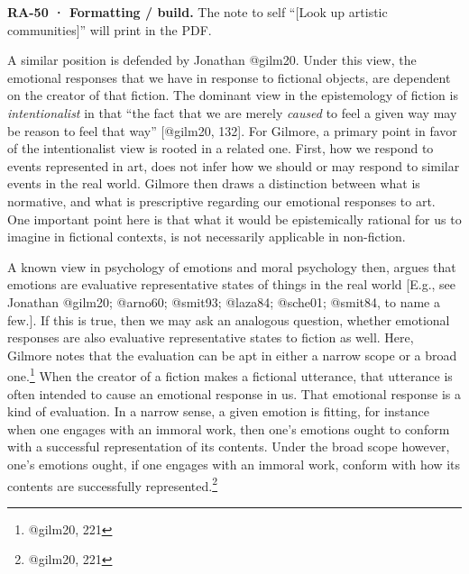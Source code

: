 \documentclass[
  letterpaper,
  DIV=11,
  numbers=noendperiod]{scrartcl}
\theoremstyle{remark}
\begin{document}
\begin{tcolorbox}[enhanced jigsaw, arc=.35mm, bottomrule=.15mm, bottomtitle=1mm, breakable, colback=white, colbacktitle=quarto-callout-note-color!10!white, colframe=quarto-callout-note-color-frame, coltitle=black, left=2mm, leftrule=.75mm, opacityback=0, opacitybacktitle=0.6, rightrule=.15mm, title=\textcolor{quarto-callout-note-color}{\faInfo}\hspace{0.5em}{Note}, titlerule=0mm, toprule=.15mm, toptitle=1mm]

\textbf{RA-50 · Formatting / build.} The note to self ``{[}Look up
artistic communities{]}'' will print in the PDF.

\end{tcolorbox}

A similar position is defended by Jonathan @gilm20. Under this view, the
emotional responses that we have in response to fictional objects, are
dependent on the creator of that fiction. The dominant view in the
epistemology of fiction is \emph{intentionalist} in that ``the fact that
we are merely \emph{caused} to feel a given way may be reason to feel
that way'' {[}@gilm20, 132{]}. For Gilmore, a primary point in favor of
the intentionalist view is rooted in a related one. First, how we
respond to events represented in art, does not infer how we should or
may respond to similar events in the real world. Gilmore then draws a
distinction between what is normative, and what is prescriptive
regarding our emotional responses to art. One important point here is
that what it would be epistemically rational for us to imagine in
fictional contexts, is not necessarily applicable in non-fiction.

A known view in psychology of emotions and moral psychology then, argues
that emotions are evaluative representative states of things in the real
world {[}E.g., see Jonathan @gilm20; @arno60; @smit93; @laza84; @sche01;
@smit84, to name a few.{]}. If this is true, then we may ask an
analogous question, whether emotional responses are also evaluative
representative states to fiction as well. Here, Gilmore notes that the
evaluation can be apt in either a narrow scope or a broad
one.\footnote{@gilm20, 221} When the creator of a fiction makes a
fictional utterance, that utterance is often intended to cause an
emotional response in us. That emotional response is a kind of
evaluation. In a narrow sense, a given emotion is fitting, for instance
when one engages with an immoral work, then one's emotions ought to
conform with a successful representation of its contents. Under the
broad scope however, one's emotions ought, if one engages with an
immoral work, conform with how its contents are successfully
represented.\footnote{@gilm20, 221}
\end{document}
